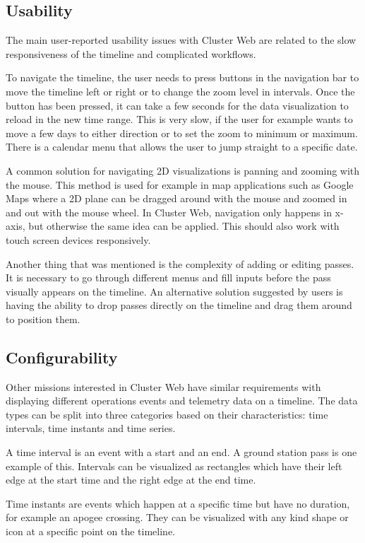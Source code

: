 \subsection{Usability}
The main user-reported usability issues with Cluster Web are related to the slow responsiveness of the timeline and complicated workflows. 

To navigate the timeline, the user needs to press buttons in the navigation bar to move the timeline left or right or to change the zoom level in intervals. Once the button has been pressed, it can take a few seconds for the data visualization to reload in the new time range. This is very slow, if the user for example wants to move a few days to either direction or to set the zoom to minimum or maximum. There is a calendar menu that allows the user to jump straight to a specific date.

A common solution for navigating 2D visualizations is panning and zooming with the mouse. This method is used for example in map applications such as Google Maps where a 2D plane can be dragged around with the mouse and zoomed in and out with the mouse wheel. In Cluster Web, navigation only happens in x- axis, but otherwise the same idea can be applied. This should also work with touch screen devices responsively.

Another thing that was mentioned is the complexity of adding or editing passes. It is necessary to go through different menus and fill inputs before the pass visually appears on the timeline. An alternative solution suggested by users is having the ability to drop passes directly on the timeline and drag them around to position them.

\subsection{Configurability}
Other missions interested in Cluster Web have similar requirements with displaying different operations events and telemetry data on a timeline. The data types can be split into three categories based on their characteristics: time intervals, time instants and time series.

A time interval is an event with a start and an end. A ground station pass is one example of this. Intervals can be visualized as rectangles which have their left edge at the start time and the right edge at the end time.

Time instants are events which happen at a specific time but have no duration, for example an apogee crossing. They can be visualized with any kind shape or icon at a specific point on the timeline.

